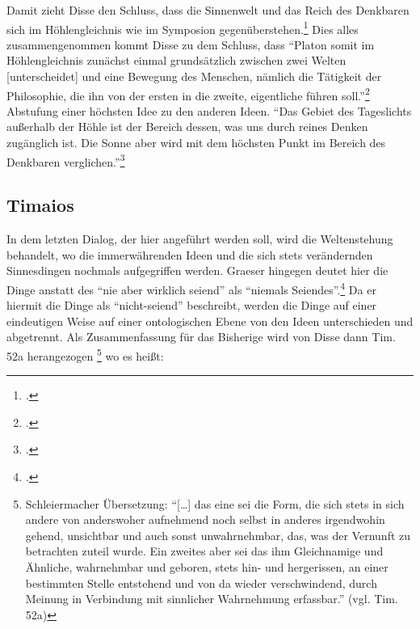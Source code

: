 Damit zieht Disse den Schluss, dass die Sinnenwelt und das Reich des Denkbaren sich im Höhlengleichnis wie im Symposion gegenüberstehen.\footcite[vgl.][S. 28]{DisseMetaphysik}
Dies alles zusammengenommen kommt Disse zu dem Schluss, dass \enquote{Platon somit im Höhlengleichnis zunächst einmal grundsätzlich zwischen zwei Welten [unterscheidet] und eine Bewegung des Menschen, nämlich die Tätigkeit der Philosophie, die ihn von der ersten in die zweite, eigentliche führen soll.}\footcite[vgl.][S. 23f.]{DisseMetaphysik}
Abstufung einer höchsten Idee zu den anderen Ideen.
\enquote{Das Gebiet des Tageslichts außerhalb der Höhle ist der Bereich dessen, was uns durch reines Denken zugänglich ist. Die Sonne aber wird mit dem höchsten Punkt im Bereich des Denkbaren verglichen.}\footcite[][S. 49]{DisseMetaphysik}

\subsection{Timaios}
In dem letzten Dialog, der hier angeführt werden soll, wird die Weltenstehung behandelt, wo die immerwährenden Ideen und die sich stets verändernden Sinnesdingen nochmals aufgegriffen werden. 
 Graeser hingegen deutet hier die Dinge anstatt des \enquote{nie aber wirklich seiend} als \enquote{niemals Seiendes}.\footcite[vgl.][S. 140]{GraeserPhiloGeschichte} Da er hiermit die Dinge als \enquote{nicht-seiend} beschreibt, werden die Dinge auf einer eindeutigen Weise auf einer ontologischen Ebene von den Ideen unterschieden und abgetrennt.
Als Zusammenfassung für das Bisherige wird von Disse dann Tim. 52a herangezogen
\footnote{Schleiermacher Übersetzung: \enquote{[\dots] das eine sei die Form, die sich stets in sich andere von anderswoher aufnehmend noch selbst in anderes irgendwohin gehend, unsichtbar und auch sonst unwahrnehmbar, das, was der Vernunft zu betrachten zuteil wurde. Ein zweites aber sei das ihm Gleichnamige und Ähnliche, wahrnehmbar und geboren, stets hin- und hergerissen, an einer bestimmten Stelle entstehend und von da wieder verschwindend, durch Meinung in Verbindung mit sinnlicher Wahrnehmung erfassbar.} (vgl. Tim. 52a)} 
wo es heißt:
